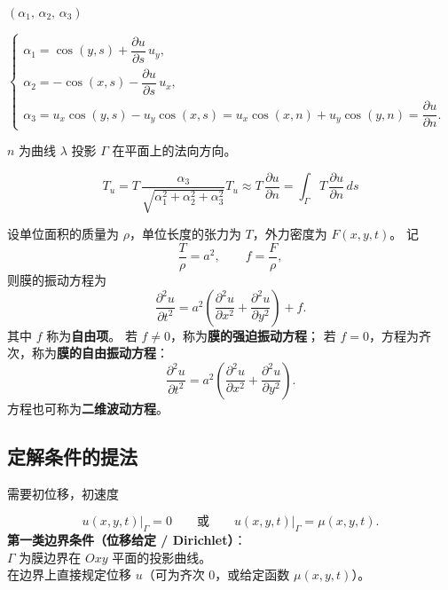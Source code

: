 \begin{solution}
\begin{dxsolution}
$
(\alpha_1,\,\alpha_2,\,\alpha_3)
$

$
\begin{cases}
\alpha_1 = \cos(y,s) + \dfrac{\partial u}{\partial s}\,u_y,\\[4pt]
\alpha_2 = -\cos(x,s) - \dfrac{\partial u}{\partial s}\,u_x,\\[4pt]
\alpha_3 = u_x\cos(y,s) - u_y\cos(x,s)
= u_x\cos(x,n) + u_y\cos(y,n)
= \dfrac{\partial u}{\partial n}.
\end{cases}
$

{\color{purple}$n$ 为曲线 $\lambda$ 投影 $\Gamma$ 在平面上的法向方向。}

$$
T_u = T\,\dfrac{\alpha_3}{\sqrt{\alpha_1^2+\alpha_2^2+\alpha_3^2}}
T_u \approx T\,\dfrac{\partial u}{\partial n}=
\int_{\Gamma} T\,\dfrac{\partial u}{\partial n}\,ds
$$
\tcblower
\end{dxsolution}
\begin{definition}[膜的振动方程]
设单位面积的质量为 $\rho$，单位长度的张力为 $T$，外力密度为 $F(x,y,t)$。  
记
$$
\frac{T}{\rho}=a^2,\qquad f=\frac{F}{\rho},
$$
则膜的振动方程为
$$
\boxed{
\frac{\partial^2 u}{\partial t^2}
= a^2\!\left(\frac{\partial^2 u}{\partial x^2}
+ \frac{\partial^2 u}{\partial y^2}\right) + f.
}
$$
其中 $f$ 称为\textbf{自由项}。  
若 $f\neq 0$，称为\textbf{膜的强迫振动方程}；  
若 $f=0$，方程为齐次，称为\textbf{膜的自由振动方程}：
$$
\frac{\partial^2 u}{\partial t^2}
= a^2\!\left(\frac{\partial^2 u}{\partial x^2}
+ \frac{\partial^2 u}{\partial y^2}\right).
$$
方程也可称为\textbf{二维波动方程}。
\end{definition}
\subsection{定解条件的提法}
需要初位移，初速度
\begin{dxsolution}
\[
\left.u(x,y,t)\right|_{\Gamma}=0
\qquad\text{或}\qquad
\left.u(x,y,t)\right|_{\Gamma}=\mu(x,y,t).
\]
\tcblower
\textbf{第一类边界条件（位移给定 / Dirichlet）}：\\
$\Gamma$ 为膜边界在 $Oxy$ 平面的投影曲线。\\
在边界上直接规定位移 $u$（可为齐次 $0$，或给定函数 $\mu(x,y,t)$）。

\end{dxsolution}

\begin{dxsolution}


\end{dxsolution}
\end{solution}
